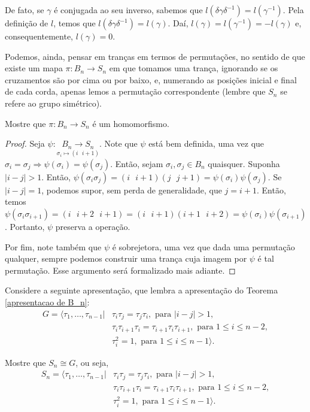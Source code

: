 	\par\vspace{0.3cm} De fato, se $\gamma$ é conjugada ao seu inverso, sabemos que $l(\delta\gamma\delta^{-1}) 
	= l(\gamma^{-1})$. Pela definição de $l$, temos que $l(\delta\gamma\delta^{-1}) = l(\gamma)$. Daí, 
	$l(\gamma) = l(\gamma^{-1}) = -l(\gamma)$ e, consequentemente, $l(\gamma) = 0$.
	
	\par\vspace{0.3cm} Podemos, ainda, pensar em tranças em termos de permutações, no sentido de que existe 
	um mapa $\pi: B_n\to S_n$ em que tomamos uma trança, ignorando se os cruzamentos são por cima ou por baixo, 
	e, numerando as posições inicial e final de cada corda, apenas lemos a permutação correspondente 
	(lembre que $S_n$ se refere ao grupo simétrico).
	\begin{lemma}
	\label{B_n iso S_n}
		Mostre que $\pi: B_n\to S_n$ é um homomorfismo.
	\end{lemma}
	\begin{proof}
		Seja $\psi:\underset{\sigma_i\mapsto(i\text{ }i+1)}{B_n\to S_n}$. Note que $\psi$ está bem definida, 
		uma vez que $\sigma_i=\sigma_j\Rightarrow\psi(\sigma_i)=\psi(\sigma_j)$. Então, sejam 
		$\sigma_i,\sigma_j\in B_n$ quaisquer. Suponha $|i-j|>1$. Então, 
		$\psi(\sigma_i\sigma_j)=(i\text{ } i+1)(j\text{ } j+1)=\psi(\sigma_i)\psi(\sigma_j)$. Se 
		$|i-j|=1$, podemos supor, sem perda de generalidade, que $j=i+1$. Então, temos
		$\psi(\sigma_i\sigma_{i+1})=(i\text{ } i+2\text{ } i+1)=(i\text{ } i+1)(i+1\text{ }
		i+2)=\psi(\sigma_i)\psi(\sigma_{i+1})$. Portanto, $\psi$ preserva a operação. 
		
		\par\vspace{0.3cm} Por fim, note também que $\psi$ é sobrejetora, uma vez que dada uma permutação 
		qualquer, sempre podemos construir uma trança cuja imagem por $\psi$ é tal permutação. Esse argumento 
		será formalizado mais adiante.
	\end{proof}
	\begin{lemma}
	\label{apresentacao de S_n}
		Considere a seguinte apresentação, que lembra a apresentação do Teorema \eqref{apresentacao de B_n}:
		\begin{align*} 
		G = 
		\langle \tau_1,\dots,\tau_{n-1} | &\tau_i\tau_j = \tau_j\tau_i, \text{ para }|i - j|>1,\\
		&\tau_i\tau_{i+1}\tau_i = \tau_{i+1}\tau_i\tau_{i+1}, \text{ para } 1\leq i\leq n-2, \\ 
		&\tau_i^2 = 1, \text{ para }1\leq i\leq n-1\rangle. 
		\end{align*}
		\par\vspace{0.3cm} Mostre que $S_n\cong G$, ou seja, 
		\begin{align*} 
		S_n 
		= \langle \tau_1,\dots,\tau_{n-1} | &\tau_i\tau_j = \tau_j\tau_i, \text{ para }|i - j|>1,\\
		&\tau_i\tau_{i+1}\tau_i = \tau_{i+1}\tau_i\tau_{i+1}, \text{ para } 1\leq i\leq n-2, \\ 
		&\tau_i^2 = 1, \text{ para }1\leq i\leq n-1\rangle. 
		\end{align*}
	\end{lemma}
